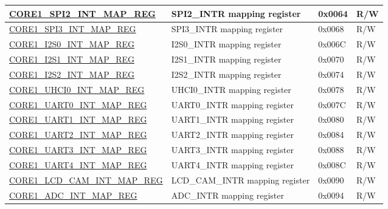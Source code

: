 \begin{longtable}{ | p{7.5cm} | p{7.2cm} | p{1.3cm} | p{1cm} | }
\hyperref[regdesc:CORE1SPI2INTMAPREG]{CORE1\_SPI2\_INT\_MAP\_REG} & SPI2\_INTR mapping register & 0x0064 & R/W \\ \hline

\hyperref[regdesc:CORE1SPI3INTMAPREG]{CORE1\_SPI3\_INT\_MAP\_REG} & SPI3\_INTR mapping register & 0x0068 & R/W \\ \hline

\hyperref[regdesc:CORE1I2S0INTMAPREG]{CORE1\_I2S0\_INT\_MAP\_REG} & I2S0\_INTR mapping register & 0x006C & R/W \\ \hline

\hyperref[regdesc:CORE1I2S1INTMAPREG]{CORE1\_I2S1\_INT\_MAP\_REG} & I2S1\_INTR mapping register & 0x0070 & R/W \\ \hline

\hyperref[regdesc:CORE1I2S2INTMAPREG]{CORE1\_I2S2\_INT\_MAP\_REG} & I2S2\_INTR mapping register & 0x0074 & R/W \\ \hline

\hyperref[regdesc:CORE1UHCI0INTMAPREG]{CORE1\_UHCI0\_INT\_MAP\_REG} & UHCI0\_INTR mapping register & 0x0078 & R/W \\ \hline

\hyperref[regdesc:CORE1UART0INTMAPREG]{CORE1\_UART0\_INT\_MAP\_REG} & UART0\_INTR mapping register & 0x007C & R/W \\ \hline

\hyperref[regdesc:CORE1UART1INTMAPREG]{CORE1\_UART1\_INT\_MAP\_REG} & UART1\_INTR mapping register & 0x0080 & R/W \\ \hline

\hyperref[regdesc:CORE1UART2INTMAPREG]{CORE1\_UART2\_INT\_MAP\_REG} & UART2\_INTR mapping register & 0x0084 & R/W \\ \hline

\hyperref[regdesc:CORE1UART3INTMAPREG]{CORE1\_UART3\_INT\_MAP\_REG} & UART3\_INTR mapping register & 0x0088 & R/W \\ \hline

\hyperref[regdesc:CORE1UART4INTMAPREG]{CORE1\_UART4\_INT\_MAP\_REG} & UART4\_INTR mapping register & 0x008C & R/W \\ \hline

\hyperref[regdesc:CORE1LCDCAMINTMAPREG]{CORE1\_LCD\_CAM\_INT\_MAP\_REG} & LCD\_CAM\_INTR mapping register & 0x0090 & R/W \\ \hline

\hyperref[regdesc:CORE1ADCINTMAPREG]{CORE1\_ADC\_INT\_MAP\_REG} & ADC\_INTR mapping register & 0x0094 & R/W \\ \hline


\end{longtable}
